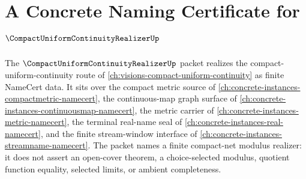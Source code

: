 \chapter{A Concrete Naming Certificate for $\CompactUniformContinuityRealizerUp$}
\label{ch:concrete-instances-compact-uniform-continuity-realizer-namecert}

The $\CompactUniformContinuityRealizerUp$ packet realizes the compact-uniform-continuity route of \autoref{ch:visions-compact-uniform-continuity} as finite NameCert data. It sits over the compact metric source of \autoref{ch:concrete-instances-compactmetric-namecert}, the continuous-map graph surface of \autoref{ch:concrete-instances-continuousmap-namecert}, the metric carrier of \autoref{ch:concrete-instances-metric-namecert}, the terminal real-name seal of \autoref{ch:concrete-instances-real-namecert}, and the finite stream-window interface of \autoref{ch:concrete-instances-streamname-namecert}. The packet names a finite compact-net modulus realizer: it does not assert an open-cover theorem, a choice-selected modulus, quotient function equality, selected limits, or ambient completeness.

